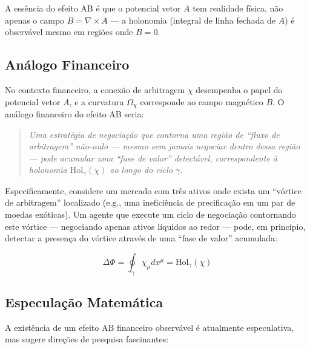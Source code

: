 A ess\^encia do efeito AB \'e que o potencial vetor $A$ tem realidade f\'isica, n\~ao apenas o campo $B = \nabla \times A$ --- a holonomia (integral de linha fechada de $A$) \'e observ\'avel mesmo em regi\~oes onde $B = 0$.

\subsection{An\'alogo Financeiro}

No contexto financeiro, a conex\~ao de arbitragem $\chi$ desempenha o papel do potencial vetor $A$, e a curvatura $\Omega_\chi$ corresponde ao campo magn\'etico $B$. O an\'alogo financeiro do efeito AB seria:

\begin{quote}
\textit{Uma estrat\'egia de negocia\c{c}\~ao que contorna uma regi\~ao de ``fluxo de arbitragem'' n\~ao-nulo --- mesmo sem jamais negociar dentro dessa regi\~ao --- pode acumular uma ``fase de valor'' detect\'avel, correspondente \`a holonomia $\text{Hol}_\gamma(\chi)$ ao longo do ciclo $\gamma$.}
\end{quote}

Especificamente, considere um mercado com tr\^es ativos onde exista um ``v\'ortice de arbitragem'' localizado (e.g., uma inefici\^encia de precifica\c{c}\~ao em um par de moedas ex\'oticas). Um agente que execute um ciclo de negocia\c{c}\~ao contornando este v\'ortice --- negociando apenas ativos l\'iquidos ao redor --- pode, em princ\'ipio, detectar a presen\c{c}a do v\'ortice atrav\'es de uma ``fase de valor'' acumulada:

\begin{equation}\label{eq:fase-AB-financeira}
\Delta\Phi = \oint_\gamma \chi_\mu dx^\mu = \text{Hol}_\gamma(\chi)
\end{equation}

\subsection{Especula\c{c}\~ao Matem\'atica}

A exist\^encia de um efeito AB financeiro observ\'avel \'e atualmente especulativa, mas sugere dire\c{c}\~oes de pesquisa fascinantes:

